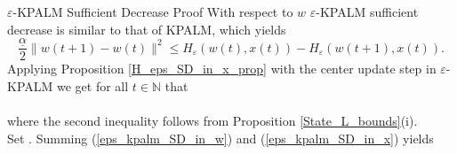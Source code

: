 \documentclass[9pt,handout]{beamer} %
\begin{document}
	\begin{frame}{$\varepsilon$-KPALM Sufficient Decrease Proof}
		\setcounter{equation}{0}		
		With respect to $w$ $\varepsilon$-KPALM sufficient decrease is similar to that of KPALM, which yields
		\begin{equation}
			\frac{\underline{\alpha}}{2} \|w(t+1) - w(t)\|^2 \leq H_{\varepsilon}(w(t),x(t)) - H_{\varepsilon}(w(t+1),x(t)). \label{eps_kpalm_SD_in_w}
		\end{equation}
		Applying Proposition \ref{H_eps_SD_in_x_prop} with the center update step in $\varepsilon$-KPALM we get for all $t \in \mathbb{N}$ that\\
		\\
		where the second inequality follows from Proposition \ref{State_L_bounds}(i).\\
		\pause
		Set . Summing (\ref{eps_kpalm_SD_in_w}) and (\ref{eps_kpalm_SD_in_x}) yields\\
	\end{frame}
	
\end{document}
